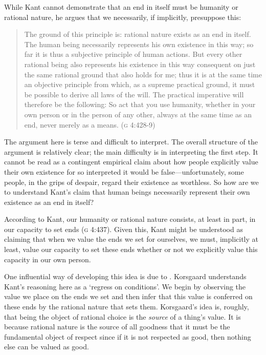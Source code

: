 \documentclass[a4paper,12pt]{article}
\begin{document}
While Kant cannot demonstrate that an end in itself must be humanity or rational nature, he argues that we necessarily, if implicitly, presuppose this: 
\begin{quote}
	The ground of this principle is: rational nature exists as an end in itself. The human being necessarily represents his own existence in this way; so far it is thus a subjective principle of human actions. But every other rational being also represents his existence in this way consequent on just the same rational ground that also holds for me; thus it is at the same time an objective principle from which, as a supreme practical ground, it must be possible to derive all laws of the will. The practical imperative will therefore be the following: So act that you use humanity, whether in your own person or in the person of any other, always at the same time as an end, never merely as a means. (\textsc{g} 4:428-9) 
\end{quote}
The argument here is terse and difficult to interpret. The overall structure of the argument is relatively clear; the main difficulty is in interpreting the first step. It cannot be read as a contingent empirical claim about how people explicitly value their own existence for so interpreted it would be false---unfortunately, some people, in the grips of despair, regard their existence as worthless. So how are we to understand Kant's claim that human beings necessarily represent their own existence as an end in itself? 

According to Kant, our humanity or rational nature consists, at least in part, in our capacity to set ends (\textsc{g} 4:437). Given this, Kant might be understood as claiming that when we value the ends we set for ourselves, we must, implicitly at least, value our capacity to set these ends whether or not we explicitly value this capacity in our own person. 

One influential way of developing this idea is due to \citet{Korsgaard:1996md}. Korsgaard understands Kant's reasoning here as a `regress on conditions'. We begin by observing the value we place on the ends we set and then infer that this value is conferred on these ends by the rational nature that sets them. Korsgaard's idea is, roughly, that being the object of rational choice is the \emph{source} of a thing's value. It is because rational nature is the source of all goodness that it must be the fundamental object of respect since if it is not respected as good, then nothing else can be valued as good.
\end{document}
